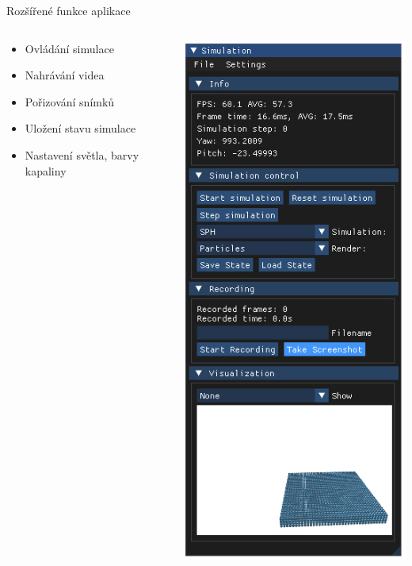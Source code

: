 \documentclass[10pt,xcolor=pdflatex,hyperref={unicode},aspectratio=169]{beamer}
\begin{document}
\begin{frame}{Rozšířené funkce aplikace}

        \begin{columns}
            \hspace{.4cm}
            \begin{column}{0.5\textwidth}
            \begin{itemize}
                \item Ovládání simulace
                \item Nahrávání videa
                \item Pořizování snímků
                \item Uložení stavu simulace
                \item Nastavení světla, barvy kapaliny
            \end{itemize}
        \end{column}
            \begin{column}{0.5\textwidth}
            \begin{center}
                \includegraphics[scale=1]{img/Main.jpg}
            \end{center}
        \end{column}
    \end{columns}
    
\end{frame}
\end{document}
